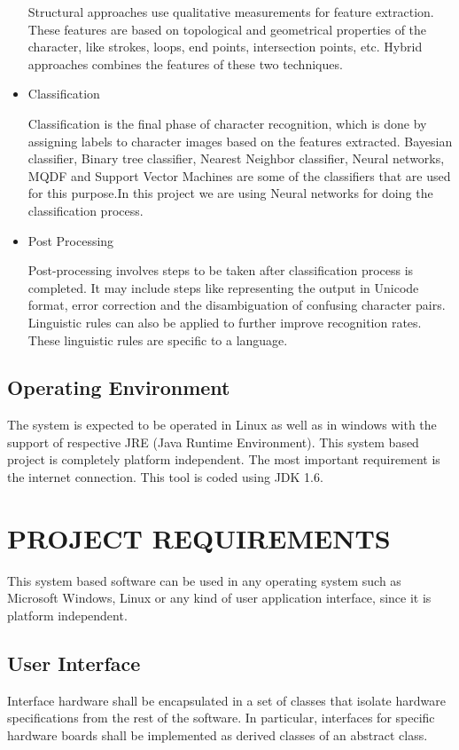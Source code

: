 \documentclass[12pt,a4paper,oneside]{report}
\begin{document}
\begin{itemize}
Structural approaches use qualitative measurements for feature extraction. These features are based
on topological and geometrical properties of the character, like strokes, loops, end points, intersection
points, etc. Hybrid approaches combines the features of these two techniques.
\item Classification
\par Classification is the final phase of character recognition, which is done by assigning labels
to character images based on the features extracted. Bayesian classifier, Binary tree classifier, Nearest
Neighbor classifier, Neural networks, MQDF and Support Vector Machines are some of the classifiers
that are used for this purpose.In this project we are using Neural networks for doing the classification
process.
\item Post Processing
\par Post-processing involves steps to be taken after classification process is completed. It may
include steps like representing the output in Unicode format, error correction and the disambiguation
of confusing character pairs. Linguistic rules can also be applied to further improve recognition rates.
These linguistic rules are specific to a language.
\end{itemize}

 
\section{Operating Environment}
The system is expected to be operated in Linux as well as in windows with the support of
respective JRE (Java Runtime Environment). This system based project is completely platform
independent. The most important requirement is the internet connection. This tool is coded
using JDK 1.6.

\chapter{PROJECT REQUIREMENTS}
\par
This system based software can be used in any operating system such as Microsoft Windows, Linux or any kind of user application interface, since it is platform independent.
\section{User Interface}
Interface hardware shall be encapsulated in a set of classes that isolate hardware specifications from the rest of the software. In particular, interfaces for specific hardware boards shall be implemented as derived classes of an abstract class.
\
\end{document}
